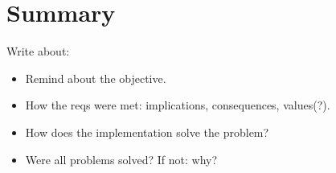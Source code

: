 %
%
%
%
%

\chapter{Summary}
\label{chap:summary}

Write about:

\begin{itemize}
	\item Remind about the objective.
	\item {}How the reqs were met: implications, consequences, values(?).
	\item How does the implementation solve the problem?
	\item Were all problems solved? If not: why?
\end{itemize}
